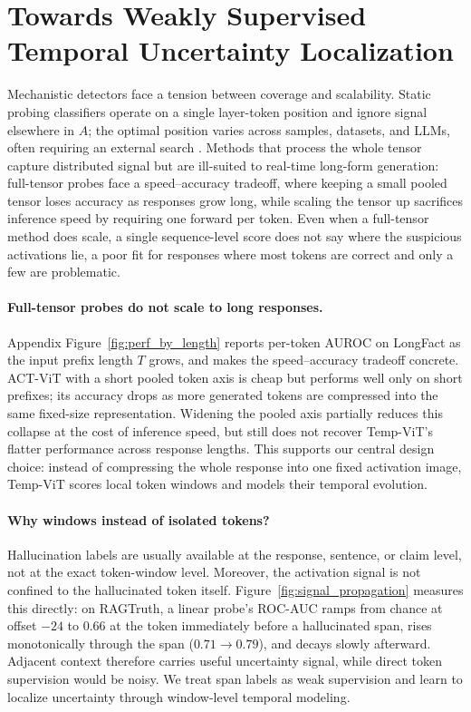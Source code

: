 \section{Towards Weakly Supervised Temporal Uncertainty Localization}
\label{sec:non_static}

Mechanistic detectors face a tension between coverage and scalability.
Static probing classifiers \citep{azaria2023,orgad2024} operate on a
single layer-token position and ignore signal elsewhere in $A$; the
optimal position varies across samples, datasets, and LLMs, often
requiring an external search \citep{orgad2024}. Methods that process
the whole tensor capture distributed signal but are ill-suited to
real-time long-form generation: full-tensor probes face a
speed--accuracy tradeoff, where keeping a small pooled tensor loses
accuracy as responses grow long, while scaling the tensor up
sacrifices inference speed by requiring one forward per token. Even when a
full-tensor method does scale, a single sequence-level score does not
say where the suspicious activations lie, a poor fit for
responses where most tokens are correct and only a few are
problematic.

\paragraph{Full-tensor probes do not scale to long responses.}
Appendix Figure~\ref{fig:perf_by_length} reports per-token AUROC on
LongFact as the input prefix length $T$ grows, and makes the
speed--accuracy tradeoff concrete. ACT-ViT with a short pooled
token axis is cheap but performs well only on short prefixes; its
accuracy drops as more generated tokens are compressed into the
same fixed-size representation. Widening the pooled axis partially
reduces this collapse at the cost of inference speed, but still
does not recover Temp-ViT's flatter performance across response
lengths. This supports our central design choice: instead of
compressing the whole response into one fixed activation image,
Temp-ViT scores local token windows and models their temporal
evolution.

\paragraph{Why windows instead of isolated tokens?} Hallucination
labels are usually available at the response, sentence, or claim level,
not at the exact token-window level. Moreover, the activation signal
is not confined to the hallucinated token itself.
Figure~\ref{fig:signal_propagation} measures this directly: on
RAGTruth, a linear probe's ROC-AUC ramps from chance at offset $-24$
to $0.66$ at the token immediately before a hallucinated span, rises
monotonically through the span ($0.71 \to 0.79$), and decays slowly
afterward. Adjacent context therefore carries useful uncertainty
signal, while direct token supervision would be noisy. We treat span
labels as weak supervision and learn to localize uncertainty through
window-level temporal modeling.

